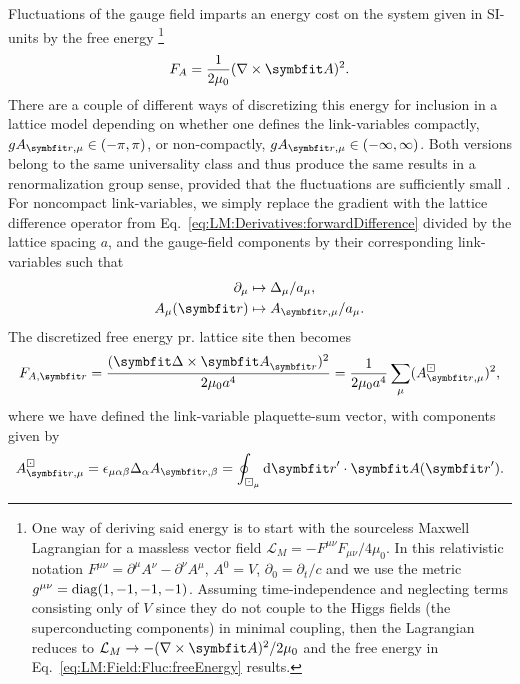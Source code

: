 Fluctuations of the gauge field imparts an energy cost on the system given in SI-units by the free energy%
\footnote{One way of deriving said energy is to start with the sourceless
Maxwell Lagrangian for a massless vector field
$\mathcal{L}_M = -F^{\mu\nu}F_{\mu\nu}/4\mu_0$. In this relativistic notation $F^{\mu\nu} = \partial^\mu A^\nu-\partial^\nu A^\mu$, $A^0 = V$, $\partial_0 = \partial_t/c$ and we use  the
metric $g^{\mu\nu} = \operatorname{diag}(1, -1, -1, -1)$. Assuming time-independence and neglecting terms consisting only of $V$ since they do not couple to the Higgs fields (\eg the superconducting
components) in minimal coupling, then the Lagrangian reduces to $\mathcal{L}_M \to -(\nabla\times\v{A})^2/2\mu_0$ and the free energy in Eq.~\eqref{eq:LM:Field:Fluc:freeEnergy} results.}
\begin{equation}
    \label{eq:LM:Field:Fluc:freeEnergy}
    F_A = \frac{1}{2\mu_0}(\nabla\times\v{A})^2.
\end{equation}
There are a couple of different ways of discretizing this energy for inclusion in a lattice model depending on whether one defines the link-variables compactly,
\ie $gA_{\v{r},\mu} \in (-\pi, \pi)$, or non-compactly, \ie $gA_{\v{r},\mu} \in (-\infty,\infty)$. Both versions belong to the same universality class and thus produce the same
results in a renormalization group sense, provided that the fluctuations are sufficiently small \cite{shimizu12}. For noncompact link-variables, we simply replace the gradient with the
lattice difference operator from Eq.~\eqref{eq:LM:Derivatives:forwardDifference} divided by the lattice spacing $a$, 
and the gauge-field components by their corresponding link-variables such that
\begin{equation}
    \label{eq:LM:Field:Fluc:discretization}
    \begin{split}
        \partial_\mu &\mapsto \Delta_\mu/a_\mu,\\
        A_\mu(\v{r}) &\mapsto A_{\v{r},\mu}/a_\mu.
    \end{split}
\end{equation}
The discretized free energy pr. lattice site then becomes
\begin{equation}
    \label{eq:LM:Field:Fluc:discretizedFreeEnergy}
    F_{A,\v{r}} = \frac{(\v{\Delta}\times\v{A}_\v{r})^2}{2\mu_0a^4} = \frac{1}{2\mu_0a^4}\sum_\mu(A^\boxdot_{\v{r},\mu})^2,
\end{equation}
where we have defined the link-variable plaquette-sum vector, with components given by
\begin{equation}
    \label{eq:LM:Field:Fluc:plaquetteSum}
    A^\boxdot_{\v{r},\mu} = \epsilon_{\mu\alpha\beta}\Delta_\alpha A_{\v{r},\beta} = \oint_{\boxdot_\mu} \mathrm{d}\v{r}'\cdot\v{A}(\v{r}').
\end{equation}
